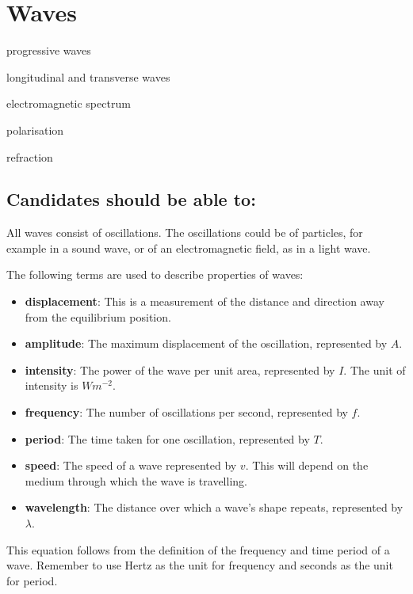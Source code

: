 \documentclass[main.tex]{subfiles}
\begin{document}
\chapter{Waves}
\begin{content}
\item progressive waves
\item longitudinal and transverse waves
\item electromagnetic spectrum
\item polarisation
\item refraction
\end{content}

\section*{Candidates should be able to:}

All waves consist of oscillations. The oscillations could be of particles, for example in a sound wave, or of an electromagnetic field, as in a light wave.

The following terms are used to describe properties of waves:
\begin{itemize}
\item \textbf{displacement}: This is a measurement of the distance and direction away from the equilibrium position.
\item \textbf{amplitude}: The maximum displacement of the oscillation, represented by $A$.
\item \textbf{intensity}: The power of the wave per unit area, represented by $I$. The unit of intensity is $Wm^{-2}$.
\item \textbf{frequency}: The number of oscillations per second, represented by $f$.
\item \textbf{period}: The time taken for one oscillation, represented by $T$.
\item \textbf{speed}: The speed of a wave represented by $v$. This will depend on the medium through which the wave is travelling.
\item \textbf{wavelength}: The distance over which a wave's shape repeats, represented by $\lambda$.

\end{itemize}


This equation follows from the definition of the frequency and time period of a wave. Remember to use Hertz as the unit for frequency and seconds as the unit for period. 
\end{document}
